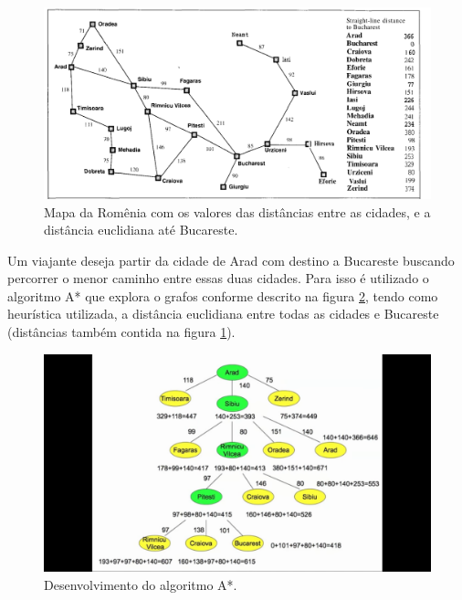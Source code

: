 \begin{figure}[H]
\centering
\includegraphics[width=.90\textwidth]{figuras/Aestrela-mapa1} 
\caption{Mapa da Romênia com os valores das distâncias entre as cidades, e a distância euclidiana até Bucareste.}
\label{fig-aestrela-algoritmo-mapa1}
\end{figure}

Um viajante deseja partir da cidade de Arad com destino a Bucareste buscando percorrer o menor caminho entre essas duas cidades. Para isso é utilizado o algoritmo A* que explora o grafos conforme descrito na figura \ref{fig-aestrela-algoritmo-mapa2}, tendo como heurística utilizada, a distância euclidiana entre todas as cidades e Bucareste (distâncias também contida na figura \ref{fig-aestrela-algoritmo-mapa1}).

\begin{figure}[H]
\centering
\includegraphics[width=.90\textwidth]{figuras/Aestrela-mapa2} 
\caption{Desenvolvimento do algoritmo A*.}
\label{fig-aestrela-algoritmo-mapa2}
\end{figure}








